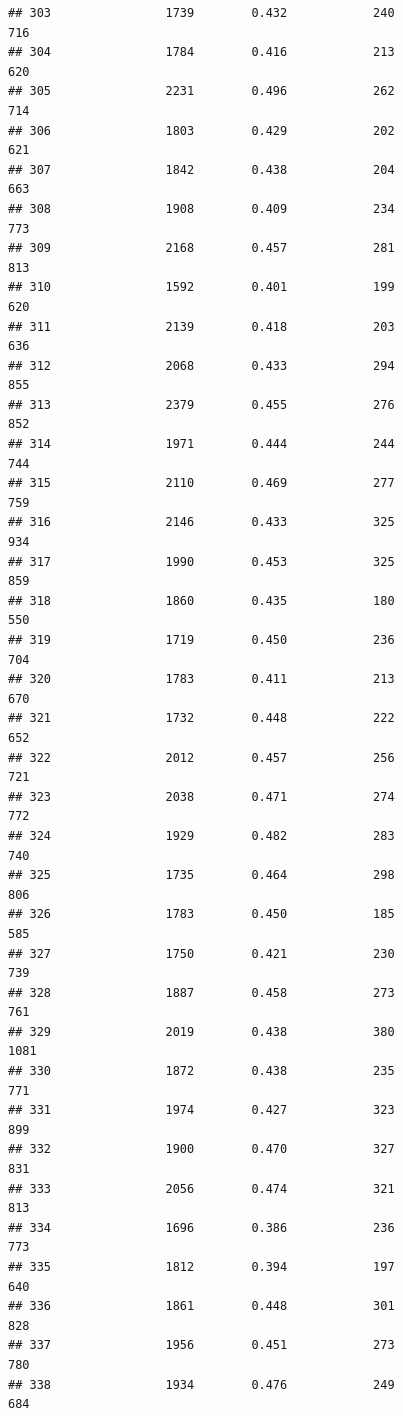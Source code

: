 \documentclass[]{book}
\begin{document}
\begin{verbatim}
## 303                1739        0.432            240                716
## 304                1784        0.416            213                620
## 305                2231        0.496            262                714
## 306                1803        0.429            202                621
## 307                1842        0.438            204                663
## 308                1908        0.409            234                773
## 309                2168        0.457            281                813
## 310                1592        0.401            199                620
## 311                2139        0.418            203                636
## 312                2068        0.433            294                855
## 313                2379        0.455            276                852
## 314                1971        0.444            244                744
## 315                2110        0.469            277                759
## 316                2146        0.433            325                934
## 317                1990        0.453            325                859
## 318                1860        0.435            180                550
## 319                1719        0.450            236                704
## 320                1783        0.411            213                670
## 321                1732        0.448            222                652
## 322                2012        0.457            256                721
## 323                2038        0.471            274                772
## 324                1929        0.482            283                740
## 325                1735        0.464            298                806
## 326                1783        0.450            185                585
## 327                1750        0.421            230                739
## 328                1887        0.458            273                761
## 329                2019        0.438            380               1081
## 330                1872        0.438            235                771
## 331                1974        0.427            323                899
## 332                1900        0.470            327                831
## 333                2056        0.474            321                813
## 334                1696        0.386            236                773
## 335                1812        0.394            197                640
## 336                1861        0.448            301                828
## 337                1956        0.451            273                780
## 338                1934        0.476            249                684

\end{verbatim}
\end{document}
